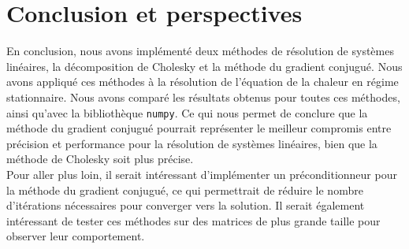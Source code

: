 \documentclass{article}
\begin{document}
\section{Conclusion et perspectives}
En conclusion, nous avons implémenté deux méthodes de résolution de systèmes linéaires, la décomposition de Cholesky et la méthode du gradient conjugué. Nous avons appliqué ces méthodes à la résolution de l'équation de la chaleur en régime stationnaire. Nous avons comparé les résultats obtenus pour toutes ces méthodes, ainsi qu'avec la bibliothèque \texttt{numpy}. Ce qui nous permet de conclure que la méthode du gradient conjugué pourrait représenter le meilleur compromis entre précision et performance pour la résolution de systèmes linéaires, bien que la méthode de Cholesky soit plus précise.\\
Pour aller plus loin, il serait intéressant d'implémenter un préconditionneur pour la méthode du gradient conjugué, ce qui permettrait de réduire le nombre d'itérations nécessaires pour converger vers la solution. Il serait également intéressant de tester ces méthodes sur des matrices de plus grande taille pour observer leur comportement.
\end{document}
